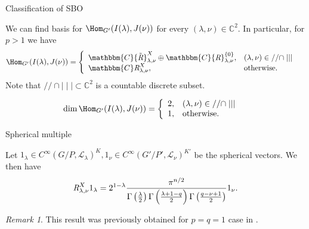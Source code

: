 \documentclass[pdf]{beamer}
\newcommand{\OpR}{\mbox{\it R}}
\theoremstyle{mystyle}
\theoremstyle{remark}
\newtheorem{remark}{Remark}
\begin{document}
\begin{frame}{Classification of SBO}
	\begin{theorem}
		We can find basis for $\Hom_{G'}(I(\lambda),J(\nu))$ for every $(\lambda,\nu)\in \mathbb{C}^2$. In particular, for $p>1$ we have
  \begin{eqnarray}
	  & \Hom_{G'}(I(\lambda),J(\nu))= \left\{
    \begin{array}{ll}
	    \mathbbm{C} {\tilde{\OpR}}_{\lambda, \nu}^{X} \oplus \mathbbm{C}
      {\OpR}^{\{ 0 \}}_{\lambda, \nu}, & (\lambda, \nu) \in / /\cap 
      \mid\mid\mid \\
      \mathbbm{C} \OpR^X_{\lambda, \nu}, &
      \mbox{\normalfont otherwise.}
    \end{array} \right. &  \nonumber
  \end{eqnarray}
  Note that $//\cap\mid\mid\mid\subset\mathbb{C}^2$ is a countable discrete subset.
		\label{}
	\end{theorem}
	\begin{corollary}
  \begin{eqnarray}
	  & \dim\Hom_{G'}(I(\lambda),J(\nu))= \left\{
    \begin{array}{ll}
	    2, & (\lambda, \nu) \in / /\cap 
      \mid\mid\mid \\
      1, &
      \mbox{\normalfont otherwise.}
    \end{array} \right. &  \nonumber
  \end{eqnarray}
	\end{corollary}
\end{frame}
\begin{frame}{Spherical multiple}
	\begin{theorem}
		Let $1_\lambda\in C^\infty(G/P,\mathcal{L}_\lambda)^K,1_\nu\in C^\infty(G'/P',\mathcal{L}_\nu)^{K'}$ be the spherical vectors. We then have
	\[ \OpR^X_{\lambda, \nu} 1_{\lambda} = 2^{1 -
     \lambda} \frac{\pi^{n / 2}}{\Gamma \left( \frac{\lambda}{2} \right)
     \Gamma \left(  \frac{\lambda + 1-q}{2} \right) \Gamma \left(
     \frac{q - \nu + 1}{2} \right)} 1_{\nu}. \]
	\end{theorem}
	\begin{remark}
		This result was previously obtained for $p=q=1$ case in \cite{bernstein2004estimates}.
	\end{remark}
\end{frame}
\end{document}
